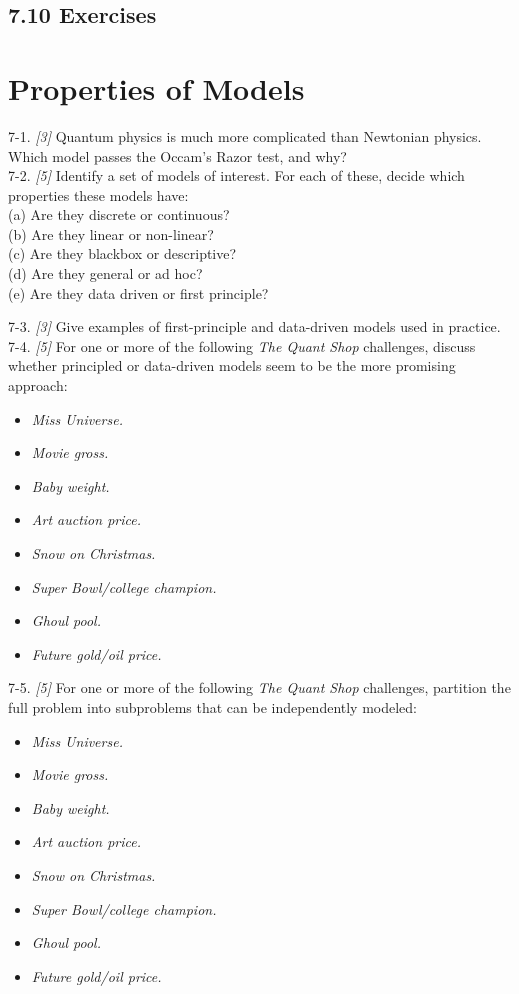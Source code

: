 \documentclass[10pt]{article}
\begin{document}
\subsection*{7.10 Exercises }
\section*{Properties of Models}
7-1. \textit{[3]} Quantum physics is much more complicated than Newtonian physics. Which model passes the Occam's Razor test, and why?\\[0pt]
7-2. \textit{[5]} Identify a set of models of interest. For each of these, decide which properties these models have:\\
(a) Are they discrete or continuous?\\
(b) Are they linear or non-linear?\\
(c) Are they blackbox or descriptive?\\
(d) Are they general or ad hoc?\\
(e) Are they data driven or first principle?

7-3. \textit{[3]} Give examples of first-principle and data-driven models used in practice.\\[0pt]
7-4. \textit{[5]} For one or more of the following \textit{The Quant Shop} challenges, discuss whether principled or data-driven models seem to be the more promising approach:

\begin{itemize}
  \item \textit{Miss Universe.}
  \item \textit{Movie gross.}
  \item \textit{Baby weight.}
  \item \textit{Art auction price.}
  \item \textit{Snow on Christmas.}
  \item \textit{Super Bowl/college champion.}
  \item \textit{Ghoul pool.}
  \item \textit{Future gold/oil price.}
\end{itemize}

7-5. \textit{[5]} For one or more of the following \textit{The Quant Shop} challenges, partition the full problem into subproblems that can be independently modeled:

\begin{itemize}
  \item \textit{Miss Universe.}
  \item \textit{Movie gross.}
  \item \textit{Baby weight.}
  \item \textit{Art auction price.}
  \item \textit{Snow on Christmas.}
  \item \textit{Super Bowl/college champion.}
  \item \textit{Ghoul pool.}
  \item \textit{Future gold/oil price.}
\end{itemize}
\end{document}
